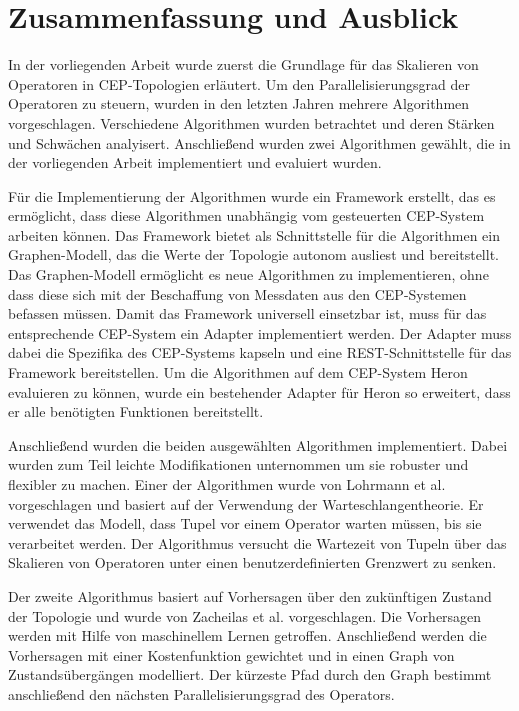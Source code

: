 
\chapter{Zusammenfassung und Ausblick}\label{chap:zusfas}
In der vorliegenden Arbeit wurde zuerst die Grundlage für das Skalieren von Operatoren in CEP-Topologien erläutert.
Um den Parallelisierungsgrad der Operatoren zu steuern, wurden in den letzten Jahren mehrere Algorithmen vorgeschlagen.
Verschiedene Algorithmen wurden betrachtet und deren Stärken und Schwächen analyisert.
Anschließend wurden zwei Algorithmen gewählt, die in der vorliegenden Arbeit implementiert und  evaluiert wurden.

Für die Implementierung der Algorithmen wurde ein Framework erstellt, das es ermöglicht, dass diese Algorithmen unabhängig vom gesteuerten CEP-System arbeiten können.
Das Framework bietet als Schnittstelle für die Algorithmen ein Graphen-Modell, das die Werte der Topologie autonom ausliest und bereitstellt.
Das Graphen-Modell ermöglicht es neue Algorithmen zu implementieren, ohne dass diese sich mit der Beschaffung von Messdaten aus den CEP-Systemen befassen müssen.
Damit das Framework universell einsetzbar ist, muss für das entsprechende CEP-System ein Adapter implementiert werden.
Der Adapter muss dabei die Spezifika des CEP-Systems kapseln und eine REST-Schnittstelle für das Framework bereitstellen.
Um die Algorithmen auf dem CEP-System Heron evaluieren zu können, wurde ein bestehender Adapter für Heron so erweitert, dass er alle benötigten Funktionen bereitstellt.

Anschließend wurden die beiden ausgewählten Algorithmen implementiert.
Dabei wurden zum Teil leichte Modifikationen unternommen um sie robuster und flexibler zu machen.
Einer der Algorithmen wurde von Lohrmann et al. vorgeschlagen und basiert auf der Verwendung der Warteschlangentheorie.
Er verwendet das Modell, dass Tupel vor einem Operator warten müssen, bis sie verarbeitet werden.
Der Algorithmus versucht die Wartezeit von Tupeln über das Skalieren von Operatoren unter einen benutzerdefinierten Grenzwert zu senken.

Der zweite Algorithmus basiert auf Vorhersagen über den zukünftigen Zustand der Topologie und wurde von Zacheilas et al. vorgeschlagen.
Die Vorhersagen werden mit Hilfe von maschinellem Lernen getroffen.
Anschließend werden die Vorhersagen mit einer Kostenfunktion gewichtet und in einen Graph von Zustandsübergängen modelliert.
Der kürzeste Pfad durch den Graph bestimmt anschließend den nächsten Parallelisierungsgrad des Operators.

